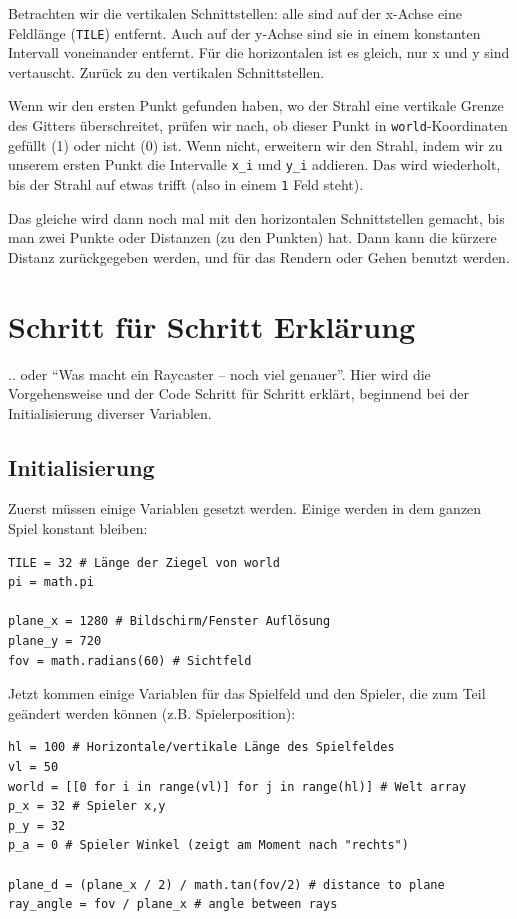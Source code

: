 \documentclass[a4paper,12pt]{report}
\begin{document}
Betrachten wir die vertikalen Schnittstellen: alle sind auf der x-Achse eine Feldlänge (\texttt{TILE}) entfernt. Auch auf der y-Achse sind sie in einem konstanten Intervall voneinander entfernt. Für die horizontalen ist es gleich, nur x und y sind vertauscht. Zurück zu den vertikalen Schnittstellen.

Wenn wir den ersten Punkt gefunden haben, wo der Strahl eine vertikale Grenze des Gitters überschreitet, prüfen wir nach, ob dieser Punkt in \texttt{world}-Koordinaten gefüllt (1) oder nicht (0) ist. Wenn nicht, erweitern wir den Strahl, indem wir zu unserem ersten Punkt die Intervalle \texttt{x\_i} und \texttt{y\_i} addieren. Das wird wiederholt, bis der Strahl auf etwas trifft (also in einem \texttt{1} Feld steht).

Das gleiche wird dann noch mal mit den horizontalen Schnittstellen gemacht, bis man zwei Punkte oder Distanzen (zu den Punkten) hat. Dann kann die kürzere Distanz zurückgegeben werden, und für das Rendern oder Gehen benutzt werden.

\section{Schritt für Schritt Erklärung}

.. oder ``Was macht ein Raycaster -- noch viel genauer''. Hier wird die Vorgehensweise und der Code Schritt für Schritt erklärt, beginnend bei der Initialisierung diverser Variablen.

\subsection{Initialisierung}

Zuerst müssen einige Variablen gesetzt werden. Einige werden in dem ganzen Spiel konstant bleiben:
\begin{Verbatim}[baselinestretch=1.0, xleftmargin=1cm]
TILE = 32 # Länge der Ziegel von world
pi = math.pi

plane_x = 1280 # Bildschirm/Fenster Auflösung
plane_y = 720
fov = math.radians(60) # Sichtfeld
\end{Verbatim}

Jetzt kommen einige Variablen für das Spielfeld und den Spieler, die zum Teil geändert werden können (z.B. Spielerposition):
\begin{Verbatim}[baselinestretch=1.0, xleftmargin=1cm]
hl = 100 # Horizontale/vertikale Länge des Spielfeldes
vl = 50
world = [[0 for i in range(vl)] for j in range(hl)] # Welt array
p_x = 32 # Spieler x,y
p_y = 32
p_a = 0 # Spieler Winkel (zeigt am Moment nach "rechts")

plane_d = (plane_x / 2) / math.tan(fov/2) # distance to plane
ray_angle = fov / plane_x # angle between rays
\end{Verbatim}
\end{document}
